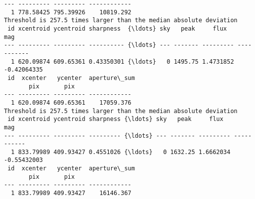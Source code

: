 \documentclass[11pt]{article}
\begin{document}
\begin{Verbatim}[commandchars=\\\{\}]
--- --------- --------- ------------
  1 778.58425 795.39926    10819.292
Threshold is 257.5 times larger than the median absolute deviation
 id xcentroid ycentroid sharpness  {\ldots} sky   peak     flux       mag
--- --------- --------- ---------- {\ldots} --- ------- --------- -----------
  1 620.09874 609.65361 0.43350301 {\ldots}   0 1495.75 1.4731852 -0.42064335
 id  xcenter   ycenter  aperture\_sum
       pix       pix
--- --------- --------- ------------
  1 620.09874 609.65361    17059.376
Threshold is 257.5 times larger than the median absolute deviation
 id xcentroid ycentroid sharpness {\ldots} sky   peak     flux       mag
--- --------- --------- --------- {\ldots} --- ------- --------- -----------
  1 833.79989 409.93427 0.4551026 {\ldots}   0 1632.25 1.6662034 -0.55432003
 id  xcenter   ycenter  aperture\_sum
       pix       pix
--- --------- --------- ------------
  1 833.79989 409.93427    16146.367
    \end{Verbatim}

    \begin{center}
    \end{center}
    { \hspace*{\fill} \\}
    
\end{document}
